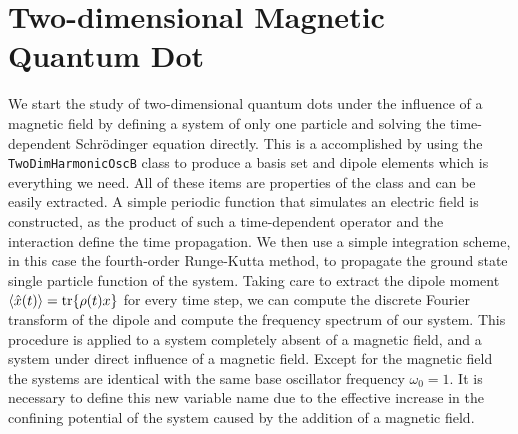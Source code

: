 \section{Two-dimensional Magnetic Quantum Dot}

We start the study of two-dimensional quantum dots under the influence of a magnetic 
field by defining a system of only one particle and solving the time-dependent 
Schrödinger equation
directly. This is a accomplished by using the \lstinline{TwoDimHarmonicOscB} class
to produce a basis set and dipole elements
which is everything we need. All of these items are properties of the class and can be
easily extracted. A simple periodic function that simulates an electric field is constructed, as 
the product of such a time-dependent operator and the interaction define the 
time propagation. We then use a simple integration scheme, in this case the fourth-order 
Runge-Kutta method, to propagate the ground state single particle function of the system.
Taking care to extract the dipole moment $\ev{\hat{x}(t)} = \tr{\rho(t) x}$
for every time step, we can compute the discrete Fourier 
transform of the dipole and compute the frequency spectrum of our system. This procedure is 
applied to a system completely absent of a magnetic field, and a system under direct influence 
of a magnetic field. Except for the magnetic field the systems are identical with the 
same base oscillator frequency $\omega_0 = 1$. It is necessary to define this new variable 
name due to the effective increase in the confining potential of the system caused by the 
addition of a magnetic field.

